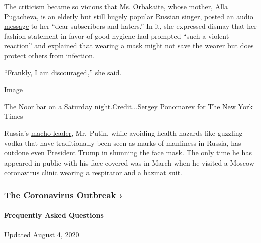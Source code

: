 The criticism became so vicious that Ms. Orbakaite, whose mother, Alla
Pugacheva, is an elderly but still hugely popular Russian singer,
\href{https://www.instagram.com/tv/CCHJPXkpV72/?utm_source=ig_embed}{posted
an audio message} to her ``dear subscribers and haters.'' In it, she
expressed dismay that her fashion statement in favor of good hygiene had
prompted ``such a violent reaction'' and explained that wearing a mask
might not save the wearer but does protect others from infection.

``Frankly, I am discouraged,'' she said.

Image

The Noor bar on a Saturday night.Credit...Sergey Ponomarev for The New
York Times

Russia's
\href{https://www.nytimes3xbfgragh.onion/2017/08/05/world/europe/vladimir-putin-russia-summer-vacation.html}{macho
leader}, Mr. Putin, while avoiding health hazards like guzzling vodka
that have traditionally been seen as marks of manliness in Russia, has
outdone even President Trump in shunning the face mask. The only time he
has appeared in public with his face covered was in March when he
visited a Moscow coronavirus clinic wearing a respirator and a hazmat
suit.

\href{https://www.nytimes3xbfgragh.onion/news-event/coronavirus?action=click\&pgtype=Article\&state=default\&region=MAIN_CONTENT_3\&context=storylines_faq}{}

\hypertarget{the-coronavirus-outbreak-}{%
\subsubsection{The Coronavirus Outbreak
›}\label{the-coronavirus-outbreak-}}

\hypertarget{frequently-asked-questions}{%
\paragraph{Frequently Asked
Questions}\label{frequently-asked-questions}}

Updated August 4, 2020

